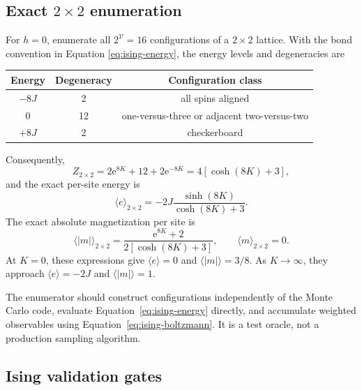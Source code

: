 \documentclass[11pt]{article}
\newcommand{\ee}{\mathrm{e}}
\newcommand{\Vlat}{\mathcal{V}}
\begin{document}
\subsection{Exact \texorpdfstring{\(2\times2\)}{2x2} enumeration}

For \(h=0\), enumerate all \(2^{\Vlat}=16\) configurations of a
\(2\times2\) lattice.  With the bond convention in Equation
\eqref{eq:ising-energy}, the energy levels and degeneracies are
\begin{center}
\begin{tabular}{@{}ccc@{}}
\toprule
Energy & Degeneracy & Configuration class \\
\midrule
\(-8J\) & 2 & all spins aligned \\
\(0\) & 12 & one-versus-three or adjacent two-versus-two \\
\(+8J\) & 2 & checkerboard \\
\bottomrule
\end{tabular}
\end{center}
Consequently,
\begin{equation}
  Z_{2\times2}
  =2\ee^{8K}+12+2\ee^{-8K}
  =4\left[\cosh(8K)+3\right],
  \label{eq:ising-2x2-partition}
\end{equation}
and the exact per-site energy is
\begin{equation}
  \langle e\rangle_{2\times2}
  =-2J\frac{\sinh(8K)}{\cosh(8K)+3}.
  \label{eq:ising-2x2-energy}
\end{equation}
The exact absolute magnetization per site is
\begin{equation}
  \langle |m|\rangle_{2\times2}
  =\frac{\ee^{8K}+2}{2[\cosh(8K)+3]},
  \qquad
  \langle m\rangle_{2\times2}=0.
  \label{eq:ising-2x2-magnetization}
\end{equation}
At \(K=0\), these expressions give \(\langle e\rangle=0\) and
\(\langle|m|\rangle=3/8\).  As \(K\to\infty\), they approach
\(\langle e\rangle=-2J\) and \(\langle|m|\rangle=1\).

The enumerator should construct configurations independently of the Monte
Carlo code, evaluate Equation~\eqref{eq:ising-energy} directly, and accumulate
weighted observables using Equation~\eqref{eq:ising-boltzmann}.  It is a test
oracle, not a production sampling algorithm.

\subsection{Ising validation gates}
\end{document}
